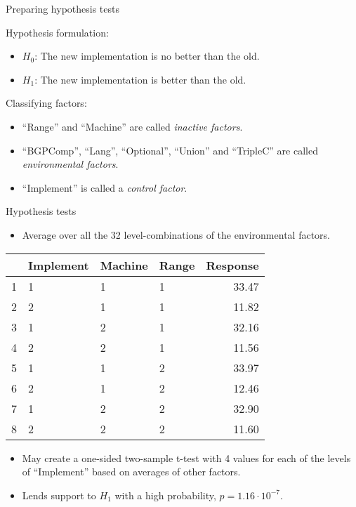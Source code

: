\documentclass[english,usenames,dvipsnames,aspectratio=169]{beamer}
\begin{document}
\begin{frame}{Preparing hypothesis tests}

Hypothesis formulation:
  \begin{itemize}
  \item $H_0$: The new implementation is no better than the old.
  \item $H_1$: The new implementation is better than the old.
  \end{itemize}

Classifying factors:
  \begin{itemize}
  \item ``Range'' and ``Machine'' are called \emph{inactive factors}.
  \item ``BGPComp'', ``Lang'', ``Optional'', ``Union'' and ``TripleC''
    are called \emph{environmental factors}.
  \item ``Implement'' is called a \emph{control factor}.
  \end{itemize}

\end{frame}
\begin{frame}{Hypothesis tests}

\begin{itemize}
\item Average over all the 32 level-combinations of the environmental
  factors. 
\end{itemize}

\begin{table}[ht]
\begin{center}
\begin{tabular}{rlll|r}
  \hline
 & Implement & Machine & Range & Response \\ 
  \hline
1 & 1 & 1 & 1 & 33.47 \\ 
  2 & 2 & 1 & 1 & 11.82 \\ 
  3 & 1 & 2 & 1 & 32.16 \\ 
  4 & 2 & 2 & 1 & 11.56 \\ 
  5 & 1 & 1 & 2 & 33.97 \\ 
  6 & 2 & 1 & 2 & 12.46 \\ 
  7 & 1 & 2 & 2 & 32.90 \\ 
  8 & 2 & 2 & 2 & 11.60 \\ 
   \hline
\end{tabular}
\end{center}
\end{table}

\begin{itemize}

\item May create a one-sided two-sample t-test with 4 values for each
  of the levels of ``Implement'' based on averages of other factors.
\item Lends support to $H_1$ with a high probability, $p=1.16 \cdot
10^{-7}$.

\end{itemize}

\end{frame}
\end{document}
